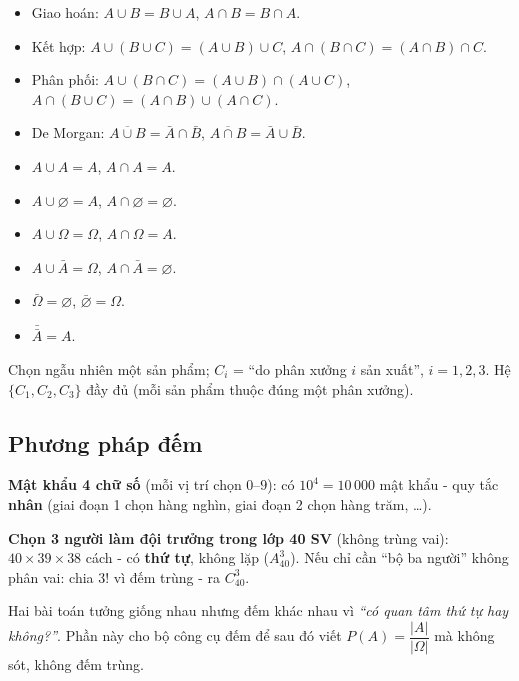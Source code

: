 \documentclass[12pt,a4paper]{article}
\begin{document}
\begin{tinhchat}[title={Đại số tập hợp}]
\begin{itemize}
  \item Giao hoán: $A \cup B = B \cup A$, $A \cap B = B \cap A$.
  \item Kết hợp: $A \cup (B \cup C) = (A \cup B) \cup C$, $A \cap (B \cap C) = (A \cap B) \cap C$.
  \item Phân phối: $A \cup (B \cap C) = (A \cup B) \cap (A \cup C)$, $A \cap (B \cup C) = (A \cap B) \cup (A \cap C)$.
  \item De Morgan: $\overline{A \cup B} = \bar{A} \cap \bar{B}$, $\overline{A \cap B} = \bar{A} \cup \bar{B}$.
  \item $A \cup A = A$, $A \cap A = A$.
  \item $A \cup \varnothing = A$, $A \cap \varnothing = \varnothing$.
  \item $A \cup \Omega = \Omega$, $A \cap \Omega = A$.
  \item $A \cup \bar{A} = \Omega$, $A \cap \bar{A} = \varnothing$.
  \item $\bar{\Omega} = \varnothing$, $\bar{\varnothing} = \Omega$.
  \item $\bar{\bar{A}} = A$.
\end{itemize}
\end{tinhchat}

\begin{vidu}[title={Hệ đầy đủ - ba phân xưởng}]
Chọn ngẫu nhiên một sản phẩm; $C_i$ = ``do phân xưởng $i$ sản xuất'', $i = 1,2,3$. Hệ $\{C_1, C_2, C_3\}$ đầy đủ (mỗi sản phẩm thuộc đúng một phân xưởng).
\end{vidu}

\subsection{Phương pháp đếm}

\begin{dongco}[title={Động cơ học - Mật khẩu và vé số}]
\textbf{Mật khẩu 4 chữ số} (mỗi vị trí chọn $0$--$9$): có $10^4 = 10\,000$ mật khẩu - quy tắc \textbf{nhân} (giai đoạn 1 chọn hàng nghìn, giai đoạn 2 chọn hàng trăm, \ldots).

\textbf{Chọn 3 người làm đội trưởng trong lớp 40 SV} (không trùng vai): $40 \times 39 \times 38$ cách - có \textbf{thứ tự}, không lặp ($A_{40}^3$). Nếu chỉ cần ``bộ ba người'' không phân vai: chia $3!$ vì đếm trùng - ra $C_{40}^3$.

Hai bài toán tưởng giống nhau nhưng đếm khác nhau vì \emph{``có quan tâm thứ tự hay không?''}. Phần này cho bộ công cụ đếm để sau đó viết $P(A) = \dfrac{|A|}{|\Omega|}$ mà không sót, không đếm trùng.
\end{dongco}
\end{document}
